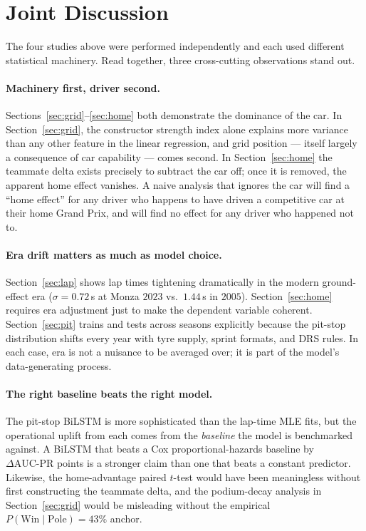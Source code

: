 \documentclass[11pt,a4paper]{article}
\theoremstyle{remark}
\begin{document}
\section{Joint Discussion}\label{sec:joint}

The four studies above were performed independently and each used
different statistical machinery. Read together, three cross-cutting
observations stand out.

\paragraph{Machinery first, driver second.}
Sections~\ref{sec:grid}--\ref{sec:home} both demonstrate the
dominance of the car. In Section~\ref{sec:grid}, the constructor
strength index alone explains more variance than any other feature
in the linear regression, and grid position --- itself largely a
consequence of car capability --- comes second. In Section~\ref{sec:home}
the teammate delta exists precisely to subtract the car off; once it
is removed, the apparent home effect vanishes. A naive analysis that
ignores the car will find a ``home effect'' for any driver who
happens to have driven a competitive car at their home Grand Prix,
and will find no effect for any driver who happened not to.

\paragraph{Era drift matters as much as model choice.}
Section~\ref{sec:lap} shows lap times tightening dramatically in the
modern ground-effect era ($\sigma = 0.72$\,s at Monza $2023$ vs.\
$1.44$\,s in $2005$). Section~\ref{sec:home} requires era adjustment
just to make the dependent variable coherent. Section~\ref{sec:pit}
trains and tests across seasons explicitly because the pit-stop
distribution shifts every year with tyre supply, sprint formats, and
DRS rules. In each case, era is not a nuisance to be averaged over;
it is part of the model's data-generating process.

\paragraph{The right baseline beats the right model.}
The pit-stop BiLSTM is more sophisticated than the lap-time MLE
fits, but the operational uplift from each comes from the
\emph{baseline} the model is benchmarked against. A BiLSTM that
beats a Cox proportional-hazards baseline by $\Delta\!\text{AUC-PR}$
points is a stronger claim than one that beats a constant predictor.
Likewise, the home-advantage paired $t$-test would have been
meaningless without first constructing the teammate delta, and the
podium-decay analysis in Section~\ref{sec:grid} would be misleading
without the empirical $P(\text{Win}\mid\text{Pole})=43\%$ anchor.
\end{document}
